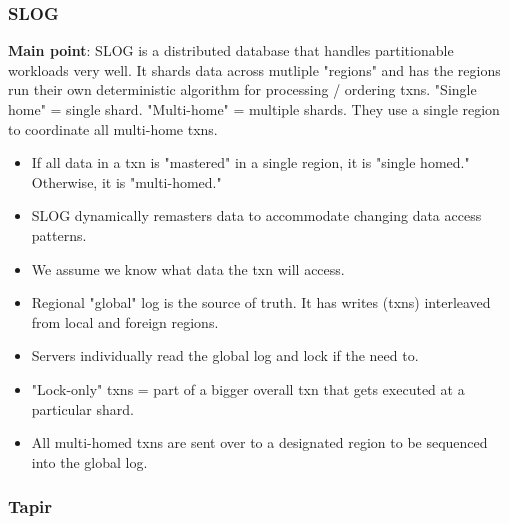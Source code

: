 \subsubsection{SLOG}
\textbf{Main point}: SLOG \cite{slog} is a distributed database that handles partitionable workloads very well. It shards data across mutliple "regions" and has the regions run their own deterministic algorithm for processing / ordering txns. "Single home" = single shard. "Multi-home" = multiple shards. They use a single region to coordinate all multi-home txns.
\begin{itemize}
    \item If all data in a txn is "mastered" in a single region, it is "single homed." Otherwise, it is "multi-homed."
    \item SLOG dynamically remasters data to accommodate changing data access patterns.
    \item We assume we know what data the txn will access.
    \item Regional "global" log is the source of truth. It has writes (txns) interleaved from local and foreign regions.
    \item Servers individually read the global log and lock if the need to.
    \item "Lock-only" txns = part of a bigger overall txn that gets executed at a particular shard.
    \item All multi-homed txns are sent over to a designated region to be sequenced into the global log.
\end{itemize}
\subsubsection{Tapir\cite{tapir}}

